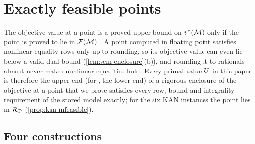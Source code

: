 \section{Exactly feasible points}\label{sec:points}

The objective value at a point is a proved upper bound on $v^{*}(\mathcal{M})$ only if the point is proved to lie in $\mathcal{F}(\mathcal{M})$ \citep[Sect.~20]{neumaier2004-complete-search-in-continuous-global}.
A point computed in floating point satisfies nonlinear equality rows only up to rounding, so its objective value can even lie below a valid dual bound (\cref{lem:sem-enclosure}(b)), and rounding it to rationals almost never makes nonlinear equalities hold.
Every primal value $U$ in this paper is therefore the upper end (for , the lower end) of a rigorous enclosure of the objective at a point that we prove satisfies every row, bound and integrality requirement of the stored model exactly; for the six KAN instances the point lies in $\mathcal{R}_{\mathrm{P}}$ (\cref{prop:kan-infeasible}).

\subsection{Four constructions}\label{sec:points-constructions}

